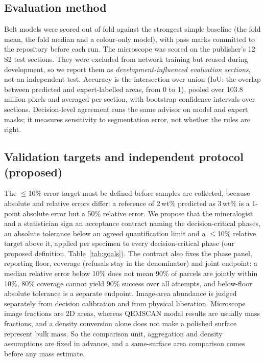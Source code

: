 \documentclass[10pt,a4paper,twocolumn]{article}
\begin{document}
\subsection{Evaluation method}\label{sec:testing}

Belt models were scored out of fold against the strongest simple baseline (the fold mean, the fold median and a colour-only model), with pass marks committed to the repository before each run. The microscope was scored on the publisher's 12 S2 test sections. They were excluded from network training but reused during development, so we report them as \emph{development-influenced evaluation sections}, not an independent test. Accuracy is the intersection over union (IoU: the overlap between predicted and expert-labelled areas, from 0 to 1), pooled over 103.8 million pixels and averaged per section, with bootstrap confidence intervals over sections. Decision-level agreement runs the same advisor on model and expert masks; it measures sensitivity to segmentation error, not whether the rules are right.

\subsection{Validation targets and independent protocol (proposed)}\label{sec:protocol}

The $\leq$10\% error target must be defined before samples are collected, because absolute and relative errors differ: a reference of 2\,wt\% predicted as 3\,wt\% is a 1-point absolute error but a 50\% relative error. We propose that the mineralogist and a statistician sign an acceptance contract naming the decision-critical phases, an absolute tolerance below an agreed quantification limit and a $\leq$10\% relative target above it, applied per specimen to every decision-critical phase (our proposed definition, Table~\ref{tab:goals}). The contract also fixes the phase panel, reporting floor, coverage (refusals stay in the denominator) and joint endpoint: a median relative error below 10\% does not mean 90\% of parcels are jointly within 10\%, 80\% coverage cannot yield 90\% success over all attempts, and below-floor absolute tolerance is a separate endpoint. Image-area abundance is judged separately from decision calibration and from physical liberation. Microscope image fractions are 2D areas, whereas QEMSCAN modal results are usually mass fractions, and a density conversion alone does not make a polished surface represent bulk mass. So the comparison unit, aggregation and density assumptions are fixed in advance, and a same-surface area comparison comes before any mass estimate.
\end{document}
